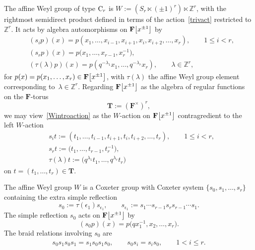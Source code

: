 \documentclass[pdftex]{sigma}
\numberwithin{equation}{section}
\begin{document}
{The affine Weyl group of type ${\rm C}_r$ is
$W:=(S_r\ltimes (\pm 1)^r)\ltimes\mathbb{Z}^r$, with the rightmost semidirect product defined in terms of the action~\eqref{trivact} restricted to $\mathbb{Z}^r$.
It acts by algebra automorphisms on $\mathbf{F}\smash{\bigl[x^{\pm 1}\bigr]}$ by
\begin{align}
&(s_ip)(x)=p(x_1,\dots,x_{i-1},x_{i+1},x_i,x_{i+2},\dots,x_r),\qquad 1\leq i<r,\nonumber\\
&(s_rp)(x)=p\bigl(x_1,\dots,x_{r-1},x_r^{-1}\bigr),\nonumber\\
&(\tau(\lambda)p)(x)=p(q^{-\lambda_1}x_1,\dots,q^{-\lambda_r}x_r),\qquad \lambda\in\mathbb{Z}^r,\label{Wintroaction}
\end{align}
for $p(x)=p(x_1,\dots,x_r)\in\mathbf{F}\smash{\bigl[x^{\pm 1}\bigr]}$, with $\tau(\lambda)$ the affine Weyl group element corresponding to~${\lambda\in\mathbb{Z}^r}$. Regarding $\mathbf{F}\smash{\bigl[x^{\pm 1}\bigr]}$ as the algebra of regular functions on
the $\mathbf{F}$-torus
\begin{equation}\label{F_torus_CC}
\mathbf{T}:=(\mathbf{F}^\times)^r,
\end{equation}
we may view~\eqref{Wintroaction} as the $W$-action on $\mathbf{F}\smash{\bigl[x^{\pm 1}\bigr]}$ contragredient to the left $W$-action
\begin{align*}
&s_it:=(t_1,\dots,t_{i-1},t_{i+1},t_i,t_{i+2},\dots,t_r),\qquad 1\leq i<r,\\
&s_rt:=\bigl(t_1,\dots,t_{r-1},t_r^{-1}\bigr),\\
&\tau(\lambda)t:=\bigl(q^{\lambda_1}t_1,\dots,q^{\lambda_r}t_r\bigr)
\end{align*}
on $t=(t_1,\dots,t_r)\in\mathbf{T}$.

The affine Weyl group $W$ is a Coxeter group with Coxeter system
$\{s_0,s_1,\dots,s_r\}$ containing the extra simple reflection
\[
s_0:=\tau(\epsilon_1)s_{\epsilon_1},\qquad s_{\epsilon_1}:=s_1\cdots s_{r-1}s_rs_{r-1}\cdots s_1.
\]
The simple reflection $s_0$ acts on $\mathbf{F}\smash{\bigl[x^{\pm 1}\bigr]}$ by
\[
(s_0p)(x)=p\bigl(qx_1^{-1},x_2,\dots,x_r\bigr).
\]
The braid relations involving $s_0$ are
\begin{gather}
s_0s_1s_0s_1=s_1s_0s_1s_0,\qquad
s_0s_i=s_is_0,\qquad 1<i\leq r.\label{braidCaff}
\end{gather}

}
\end{document}

